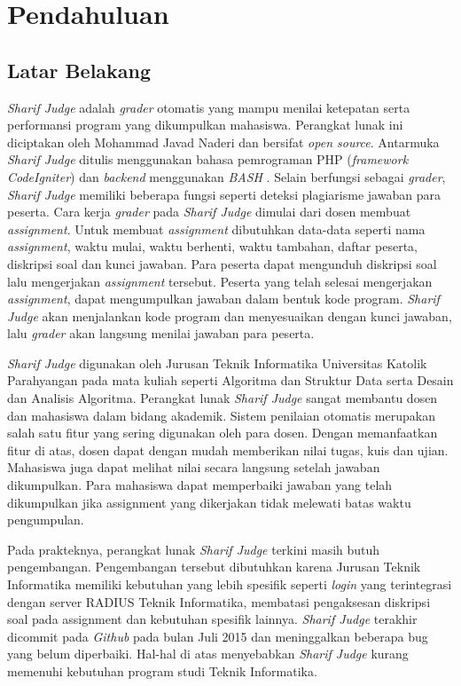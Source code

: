 \chapter{Pendahuluan}
\label{chap:intro}
   
\section{Latar Belakang}
\label{sec:label}
\textit{Sharif Judge} adalah \textit{grader} otomatis yang mampu menilai ketepatan serta performansi program yang dikumpulkan mahasiswa. Perangkat lunak ini diciptakan oleh Mohammad Javad Naderi dan bersifat \textit{open source}. Antarmuka \textit{Sharif Judge} ditulis menggunakan bahasa pemrograman PHP (\textit{framework CodeIgniter}) dan \textit{backend} menggunakan \textit{BASH} \cite{mjnaderi:14:sharifjudge}. Selain berfungsi sebagai \textit{grader}, \textit{Sharif Judge} memiliki beberapa fungsi seperti deteksi plagiarisme jawaban para peserta. Cara kerja \textit{grader} pada \textit{Sharif Judge} dimulai dari dosen membuat \textit{assignment}. Untuk membuat \textit{assignment} dibutuhkan data-data seperti nama \textit{assignment}, waktu mulai, waktu berhenti, waktu tambahan, daftar peserta, diskripsi soal dan kunci jawaban. Para peserta dapat mengunduh diskripsi soal lalu mengerjakan \textit{assignment} tersebut. Peserta yang telah selesai mengerjakan \textit{assignment}, dapat mengumpulkan jawaban dalam bentuk kode program. \textit{Sharif Judge} akan menjalankan kode program dan menyesuaikan dengan kunci jawaban, lalu \textit{grader} akan langsung menilai jawaban para peserta.

\textit{Sharif Judge} digunakan oleh Jurusan Teknik Informatika Universitas Katolik Parahyangan pada mata kuliah seperti Algoritma dan Struktur Data serta Desain dan Analisis Algoritma. Perangkat lunak \textit{Sharif Judge} sangat membantu dosen dan mahasiswa dalam bidang akademik. Sistem penilaian otomatis merupakan salah satu fitur yang sering digunakan oleh para dosen. Dengan memanfaatkan fitur di atas, dosen dapat dengan mudah memberikan nilai tugas, kuis dan ujian. Mahasiswa juga dapat melihat nilai secara langsung setelah jawaban dikumpulkan. Para mahasiswa dapat memperbaiki jawaban yang telah dikumpulkan jika assignment yang dikerjakan tidak melewati batas waktu pengumpulan.

Pada prakteknya, perangkat lunak \textit{Sharif Judge} terkini masih butuh pengembangan. Pengembangan tersebut dibutuhkan karena Jurusan Teknik Informatika memiliki kebutuhan yang lebih spesifik seperti \textit{login} yang terintegrasi dengan server RADIUS Teknik Informatika, membatasi pengaksesan diskripsi soal pada assignment dan kebutuhan spesifik lainnya. \textit{Sharif Judge} terakhir dicommit pada \textit{Github} pada bulan Juli 2015 dan meninggalkan beberapa bug yang belum diperbaiki. Hal-hal di atas menyebabkan \textit{Sharif Judge} kurang memenuhi kebutuhan program studi Teknik Informatika. 

